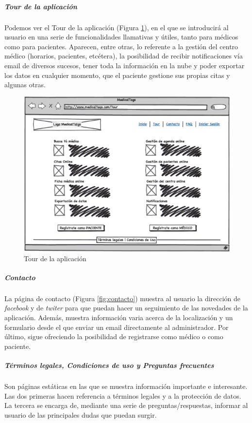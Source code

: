 		\subparagraph{Tour de la aplicación} %
		\label{par:tour_de_la_aplicacion}
		
		Podemos ver el Tour de la aplicación (Figura \ref{fig:tour}), en el que se introducirá al usuario en  una serie de funcionalidades llamativas y útiles, tanto para médicos como para pacientes. Aparecen, entre otras, lo referente a la gestión del centro médico (horarios, pacientes, etcétera), la posibilidad de recibir notificaciones vía email de diversos sucesos, tener toda la información en la nube y poder exportar los datos en cualquier momento, que el paciente gestione sus propias citas y algunas otras.
		
			\begin{figure}[H]
			  \centering
			    \includegraphics[width=12cm]{img/eps/4_Tour.eps}
			  \caption{Tour de la aplicación}
			  \label{fig:tour}
			\end{figure}
			
		
		\subparagraph{Contacto} %
		\label{par:contacto}
			La página de contacto (Figura \ref{fig:contacto}) muestra al usuario la dirección de \textit{facebook} y de \textit{twiter} para que puedan hacer un seguimiento de las novedades de la aplicación. Además, muestra información varia acerca de la localización y un formulario desde el que enviar un email directamente al administrador. Por último, sigue ofreciendo la posibilidad de registrarse como médico o como paciente.
		
		\subparagraph{Términos legales, Condiciones de uso y Preguntas frecuentes} %
		\label{par:terminos_legales_y_condiciones_de_uso}
			Son páginas estáticas en las que se muestra información importante e interesante. Las dos primeras hacen referencia a términos legales y a la protección de datos. La tercera se encarga de, mediante una serie de preguntas/respuestas, informar al usuario de las principales dudas que puedan surgir.
		
